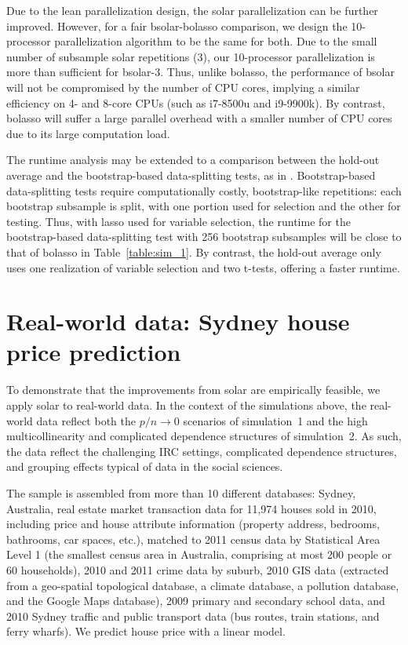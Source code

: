 \documentclass[11pt,review,authoryear]{elsarticle}
\begin{document}
Due to the lean parallelization design, the solar parallelization can be further improved. However, for a fair bsolar-bolasso comparison, we design the 10-processor parallelization algorithm to be the same for both. Due to the small number of subsample solar repetitions (3), our 10-processor parallelization is more than sufficient for bsolar-3. Thus, unlike bolasso, the performance of bsolar will not be compromised by the number of CPU cores, implying a similar efficiency on 4- and 8-core CPUs (such as i7-8500u and i9-9900k). By contrast, bolasso will suffer a large parallel overhead with a smaller number of CPU cores due to its large computation load.

The runtime analysis may be extended to a comparison between the hold-out average and the bootstrap-based data-splitting tests, as in \citet{meinshausen2009p}. Bootstrap-based data-splitting tests require computationally costly, bootstrap-like repetitions: each bootstrap subsample is split, with one portion used for selection and the other for testing. Thus, with lasso used for variable selection, the runtime for the bootstrap-based data-splitting test with 256 bootstrap subsamples will be close to that of bolasso in Table~\ref{table:sim_1}. By contrast, the hold-out average only uses one realization of variable selection and two t-tests, offering a faster runtime.

\section{Real-world data: Sydney house price prediction\label{section:application}}

To demonstrate that the improvements from solar are empirically feasible, we apply solar to real-world data. In the context of the simulations above, the real-world data reflect both the $p/n\rightarrow0$ scenarios of simulation~1 and the high multicollinearity and complicated dependence structures of simulation~2. As such, the data reflect the challenging IRC settings, complicated dependence structures, and grouping effects typical of data in the social sciences.

The sample is assembled from more than 10 different databases: Sydney, Australia, real estate market transaction data for 11,974 houses sold in 2010, including price and house attribute information (property address, bedrooms, bathrooms, car spaces, etc.), matched to 2011 census data by Statistical Area Level 1 (the smallest census area in Australia, comprising at most 200 people or 60 households), 2010 and 2011 crime data by suburb, 2010 GIS data (extracted from a geo-spatial topological database, a climate database, a pollution database, and the Google Maps database), 2009 primary and secondary school data, and 2010 Sydney traffic and public transport data (bus routes, train stations, and ferry wharfs). We predict house price with a linear model.
\end{document}
